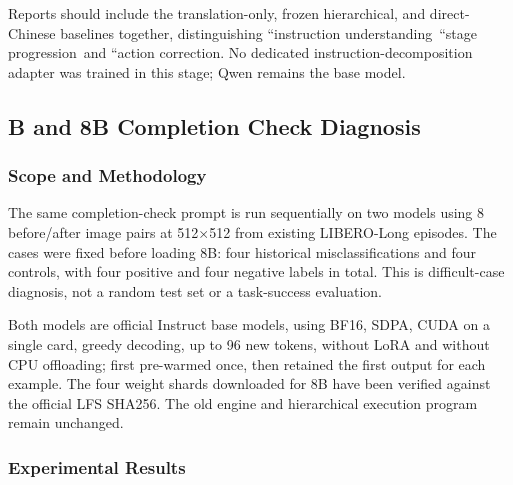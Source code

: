 Reports should include the translation-only, frozen hierarchical, and direct-Chinese baselines together, distinguishing ``instruction understanding\, ``stage progression\, and ``action correction. No dedicated instruction-decomposition adapter was trained in this stage; Qwen remains the base model.


\subsection{B and 8B Completion Check Diagnosis}\label{s09-detail-4}

\subsubsection{Scope and Methodology}\label{s09-detail-5}

The same completion-check prompt is run sequentially on two models using 8 before/after image pairs at 512\(\times\)512 from existing LIBERO-Long episodes. The cases were fixed before loading 8B: four historical misclassifications and four controls, with four positive and four negative labels in total. This is difficult-case diagnosis, not a random test set or a task-success evaluation.

Both models are official Instruct base models, using BF16, SDPA, CUDA on a single card, greedy decoding, up to 96 new tokens, without LoRA and without CPU offloading; first pre-warmed once, then retained the first output for each example. The four weight shards downloaded for 8B have been verified against the official LFS SHA256. The old engine and hierarchical execution program remain unchanged.

\subsubsection{Experimental Results}\label{s09-detail-6}

